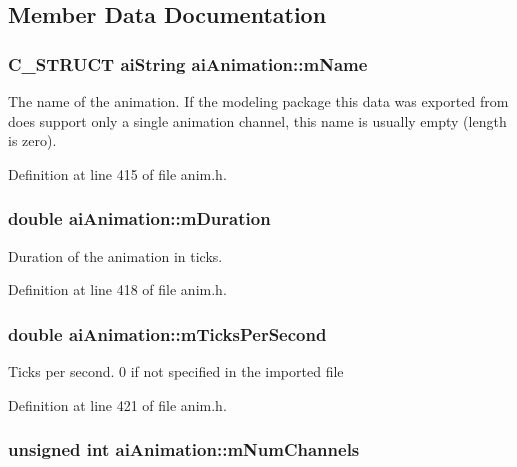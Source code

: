\subsection{Member Data Documentation}
\hypertarget{structai_animation_1be7d78d88694173a7ceef658fea77f1}{
\subsubsection[mName]{\setlength{\rightskip}{0pt plus 5cm}C\_\-STRUCT {\bf aiString} {\bf aiAnimation::mName}}}
\label{structai_animation_1be7d78d88694173a7ceef658fea77f1}


The name of the animation. If the modeling package this data was exported from does support only a single animation channel, this name is usually empty (length is zero). 

Definition at line 415 of file anim.h.\hypertarget{structai_animation_e2bbc49320b4b75c05e23e0ab704ece7}{
\subsubsection[mDuration]{\setlength{\rightskip}{0pt plus 5cm}double {\bf aiAnimation::mDuration}}}
\label{structai_animation_e2bbc49320b4b75c05e23e0ab704ece7}


Duration of the animation in ticks. 

Definition at line 418 of file anim.h.\hypertarget{structai_animation_fd26a40c3f16b6aa6e150effa3eaeab1}{
\subsubsection[mTicksPerSecond]{\setlength{\rightskip}{0pt plus 5cm}double {\bf aiAnimation::mTicksPerSecond}}}
\label{structai_animation_fd26a40c3f16b6aa6e150effa3eaeab1}


Ticks per second. 0 if not specified in the imported file 

Definition at line 421 of file anim.h.\hypertarget{structai_animation_ebfccf9a9aefa6084566d21e8a30b7e5}{
\subsubsection[mNumChannels]{\setlength{\rightskip}{0pt plus 5cm}unsigned int {\bf aiAnimation::mNumChannels}}}
\label{structai_animation_ebfccf9a9aefa6084566d21e8a30b7e5}


